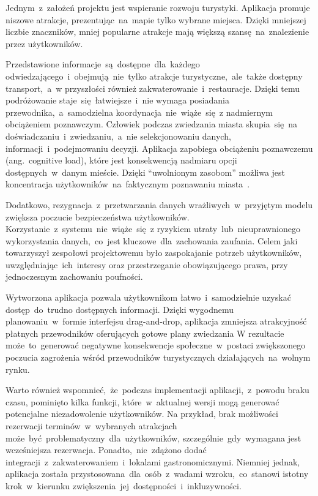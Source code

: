 \indent Jednym~z~założeń projektu jest wspieranie rozwoju turystyki.
Aplikacja promuje niszowe atrakcje, prezentując~na~mapie tylko wybrane miejsca.
Dzięki mniejszej liczbie znaczników, mniej popularne atrakcje mają większą szansę~na~znalezienie przez użytkowników.

\indent Przedstawione informacje~są~dostępne~dla~każdego odwiedzającego~i~obejmują~nie~tylko atrakcje turystyczne,~ale~także dostępny transport,~a~w przyszłości również zakwaterowanie~i~restauracje.
Dzięki temu podróżowanie staje~się~łatwiejsze~i~nie wymaga posiadania przewodnika,~a~samodzielna koordynacja~nie~wiąże~się~z nadmiernym obciążeniem poznawczym.
Człowiek podczas zwiedzania miasta skupia~się~na doświadczaniu~i~zwiedzaniu,~a~nie selekcjonowaniu danych, informacji~i~podejmowaniu decyzji.
Aplikacja zapobiega obciążeniu poznawczemu (ang.\ cognitive load), które jest konsekwencją nadmiaru opcji dostępnych~w~danym mieście.
Dzięki ``uwolnionym zasobom'' możliwa jest koncentracja użytkowników~na~faktycznym poznawaniu miasta~\cite{cognitive-biases}.

\indent Dodatkowo, rezygnacja~z~przetwarzania danych wrażliwych~w~przyjętym modelu zwiększa poczucie bezpieczeństwa użytkowników.
Korzystanie~z~systemu~nie~wiąże~się~z ryzykiem utraty~lub~nieuprawnionego wykorzystania danych,~co~jest kluczowe~dla~zachowania zaufania.
Celem jaki towarzyszył zespołowi projektowemu było zaspokajanie potrzeb użytkowników, uwzględniając~ich~interesy oraz przestrzeganie obowiązującego prawa, przy jednoczesnym zachowaniu poufności.

\indent Wytworzona aplikacja pozwala użytkownikom łatwo~i~samodzielnie uzyskać dostęp~do~trudno dostępnych informacji.
Dzięki wygodnemu planowaniu~w~formie interfejsu drag-and-drop, aplikacja zmniejsza atrakcyjność płatnych przewodników oferujących gotowe plany zwiedzania
W rezultacie może~to~generować negatywne konsekwencje społeczne~w~postaci zwiększonego poczucia zagrożenia wśród przewodników turystycznych działających~na~wolnym rynku.

\indent Warto również wspomnieć,~że~podczas implementacji aplikacji,~z~powodu braku czasu, pominięto kilka funkcji, które~w~aktualnej wersji mogą generować potencjalne niezadowolenie użytkowników.
Na przykład, brak możliwości rezerwacji terminów~w~wybranych atrakcjach może~być~problematyczny~dla~użytkowników, szczególnie~gdy~wymagana jest wcześniejsza rezerwacja.
Ponadto,~nie~zdążono dodać integracji~z~zakwaterowaniem~i~lokalami gastronomicznymi.
Niemniej jednak, aplikacja została przystosowana~dla~osób~z~wadami wzroku,~co~stanowi istotny krok~w~kierunku zwiększenia~jej~dostępności~i~inkluzywności.

